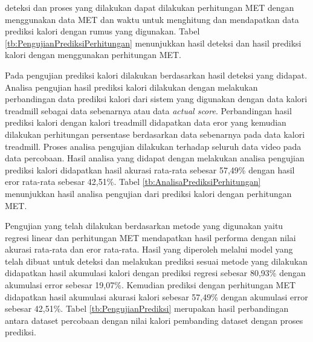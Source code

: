 \noindent
deteksi dan proses yang dilakukan dapat dilakukan perhitungan MET dengan menggunakan data MET dan waktu untuk menghitung dan mendapatkan data prediksi kalori dengan rumus yang digunakan. Tabel \ref{tb:PengujianPrediksiPerhitungan} menunjukkan hasil deteksi dan hasil prediksi kalori dengan menggunakan perhitungan MET.



Pada pengujian prediksi kalori dilakukan berdasarkan hasil deteksi yang didapat. Analisa pengujian hasil prediksi kalori dilakukan dengan melakukan perbandingan data prediksi kalori dari sistem yang digunakan dengan data kalori treadmill sebagai data sebenarnya atau data \emph{actual score}. Perbandingan hasil prediksi kalori dengan kalori treadmill didapatkan data eror yang kemudian dilakukan perhitungan persentase berdasarkan data sebenarnya pada data kalori treadmill. Proses analisa pengujian dilakukan terhadap seluruh data video pada data percobaan. Hasil analisa yang didapat dengan melakukan analisa pengujian prediksi kalori didapatkan hasil akurasi rata-rata sebesar 57,49\% dengan hasil eror rata-rata sebesar 42,51\%. Tabel \ref{tb:AnalisaPrediksiPerhitungan} menunjukkan hasil analisa pengujian dari prediksi kalori dengan perhitungan MET.

Pengujian yang telah dilakukan berdasarkan metode yang digunakan yaitu regresi linear dan perhitungan MET mendapatkan hasil performa dengan nilai akurasi rata-rata dan eror rata-rata. Hasil yang diperoleh melalui model yang telah dibuat untuk deteksi dan melakukan prediksi sesuai metode yang dilakukan didapatkan hasil akumulasi kalori dengan prediksi regresi sebesar 80,93\% dengan akumulasi error sebesar 19,07\%. Kemudian prediksi dengan perhitungan MET didapatkan hasil akumulasi akurasi kalori sebesar 57,49\% dengan akumulasi error sebesar 42,51\%. Tabel \ref{tb:PengujianPrediksi} merupakan hasil perbandingan antara dataset percobaan dengan nilai kalori pembanding dataset dengan proses prediksi.

